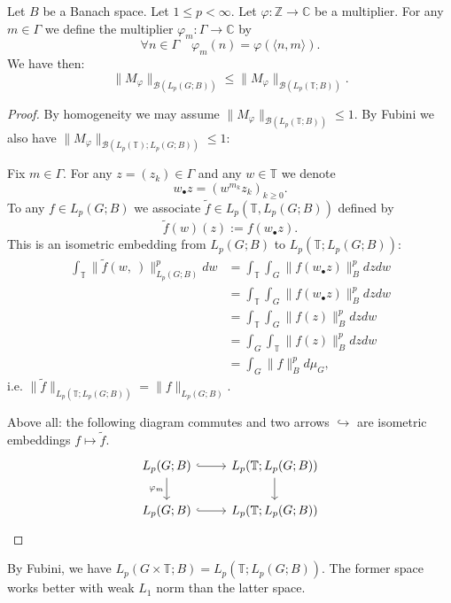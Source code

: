 \begin{lemma}\label{lem: trans}
    Let $B$ be a Banach space. Let $1\leq p<\infty$. Let $\varphi\colon \mathbb{Z}\to\mathbb{C}$ be a multiplier. For
    any $m\in \Gamma$ we define the multiplier $\varphi_m\colon\Gamma\to\mathbb{C}$ by
        \[\forall n\in\Gamma\quad \varphi_m(n)=\varphi(\langle n,m\rangle). \]
    We have then:
        \[  \|M_\varphi\|_{\mathcal{B}(L_p(G;B))}\leq\|M_\varphi\|_{\mathcal{B}(L_p(\mathbb{T};B))}.\]
\end{lemma}
\begin{proof}
By homogeneity we may assume $\|M_\varphi\|_{\mathcal{B}(L_p(\mathbb{T};B))}\leq1$. By Fubini we also have $\|M_\varphi\|_{\mathcal{B}(L_p(\mathbb{T});L_p(G;B))}\leq1$:

Fix $m \in \Gamma$. For any $z = (z_k) \in \Gamma$ and any $w \in \mathbb{T}$ we denote
    \[
        w_{\bullet}z = (w^{m_k} z_k)_{k \geq 0}.
    \]
To any $f \in L_p(G; B)$ we associate $\widetilde{f} \in L_p(\mathbb{T}, L_p(G; B))$ defined by
    \[
        \widetilde{f}(w)(z) := f(w_{\bullet}z).
    \]
This is an isometric embedding from $L_p(G;B)$ to $L_p(\mathbb{T};L_p(G;B))$:
    \begin{align*}
        \int_{\mathbb{T}}\|\widetilde{f}(w,\ )\|_{L_p(G;B)}^{p} dw
        &=\int_{\mathbb{T}}\int_{G} \|f(w_{\bullet}z)\|_B^p dz dw\\
        &=\int_{\mathbb{T}}\int_{G} \|f(w_{\bullet}z)\|_B^p dz dw\\
        &=\int_{\mathbb{T}}\int_{G} \|f(z)\|_B^p dz dw\\
        &=\int_{G}\int_{\mathbb{T}} \|f(z)\|_B^p dz dw\\
        &=\int_{G} \|f\|_B^p d\mu_G,
    \end{align*}
i.e. $\|\widetilde{f}\|_{L_p(\mathbb{T};L_p(G;B))}=\|f\|_{L_p(G;B)}$. 

Above all: the following diagram commutes and two arrows $\hookrightarrow$ are isometric embeddings $f\mapsto\widetilde{f}$.
    \[\begin{tikzcd}
        L_p(G;B) \arrow[d, "\varphi_m"'] \arrow[r, hook] & L_p(\mathbb{T};L_p(G;B)) \arrow[d] \\
        L_p(G;B) \arrow[r, hook]                         & L_p(\mathbb{T};L_p(G;B))          
        \end{tikzcd}\]
    \end{proof}
By Fubini, we have $L_p(G\times\mathbb{T};B)=L_p(\mathbb{T};L_p(G;B))$. The former space works better with weak $L_1$ norm than the latter space.
